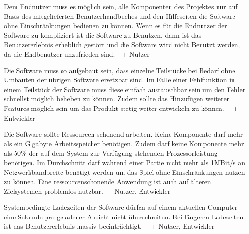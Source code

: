         {Dem Endnutzer muss es möglich sein, alle Komponenten des Projektes nur auf Basis des mitgelieferten Benutzerhandbuches und den Hilfeseiten die Software ohne Einschränkungen bedienen zu können.}
        {Wenn es für die Endnutzer der Software zu kompliziert ist die Software zu Benutzen, dann ist das Benutzererlebnis erheblich gestört und die Software wird nicht Benutzt werden, da die Endbenutzer unzufrieden sind.}
        {-}
        {+}
        {Nutzer}
        
        {Die Software muss so aufgebaut sein, dass einzelne Teilstücke bei Bedarf ohne Umbauten der übrigen Software ersetzbar sind.}
        {Im Falle einer Fehlfunktion in einem Teilstück der Software muss diese einfach austauschbar sein um den Fehler schnellst möglich beheben zu können. Zudem sollte das Hinzufügen weiterer Features möglich sein um das Produkt stetig weiter entwickeln zu können.}
        {-}
        {-+}
        {Entwickler}

        {Die Software sollte Ressourcen schonend arbeiten. Keine Komponente darf mehr als ein Gigabyte Arbeitsspeicher benötigen. Zudem darf keine Komponente mehr als $50\%$ der auf dem System zur Verfügung stehenden Prozessorleistung benötigen. Im Durchschnitt darf während einer Partie nicht mehr als 1MBit/s an Netzwerkbandbreite benötigt werden um das Spiel ohne Einschränkungen nutzen zu können.}
        {Eine ressourcenschonende Anwendung ist auch auf älteren Zielsystemen problemlos nutzbar.}
        {-}
        {-}
        {Nutzer, Entwickler}

        {Systembedingte Ladezeiten der Software dürfen auf einem aktuellen Computer eine Sekunde pro geladener Ansicht nicht überschreiten.}
        {Bei längeren Ladezeiten ist das Benutzererlebnis massiv beeinträchtigt.}
        {-}
        {-+}
        {Nutzer, Entwickler}
